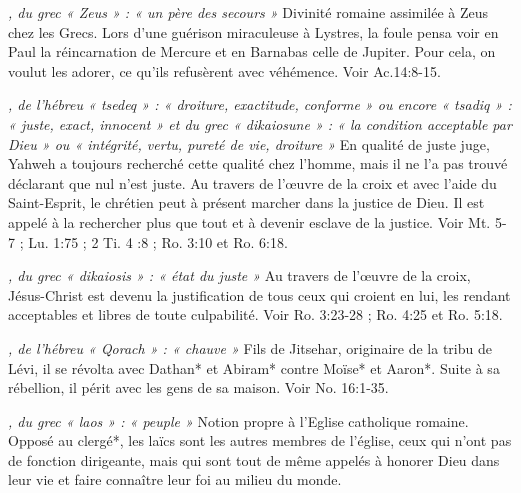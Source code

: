 \begin{multicols}{2}
{\textit{, du grec « Zeus » : « un père des secours »}\newline
Divinité romaine assimilée à Zeus chez les Grecs. Lors d'une guérison miraculeuse à Lystres, la foule pensa voir en Paul la réincarnation de Mercure et en Barnabas celle de Jupiter. Pour cela, on voulut les adorer, ce qu'ils refusèrent avec véhémence. Voir Ac.14:8-15.

\textit{, de l'hébreu « tsedeq » : « droiture, exactitude, conforme » ou encore « tsadiq » : « juste, exact, innocent » et du grec « dikaiosune » : « la condition acceptable par Dieu » ou « intégrité, vertu, pureté de vie, droiture »}\newline
En qualité de juste juge, Yahweh a toujours recherché cette qualité chez l'homme, mais il ne l'a pas trouvé déclarant que nul n'est juste. Au travers de l'œuvre de la croix et avec l'aide du Saint-Esprit, le chrétien peut à présent marcher dans la justice de Dieu. Il est appelé à la rechercher plus que tout et à devenir esclave de la justice. Voir Mt. 5-7 ; Lu. 1:75 ; 2 Ti. 4 :8 ; Ro. 3:10 et Ro. 6:18.

\textit{, du grec « dikaiosis » : « état du juste »}\newline
Au travers de l'œuvre de la croix, Jésus-Christ est devenu la justification de tous ceux qui croient en lui, les rendant acceptables et libres de toute culpabilité. Voir Ro. 3:23-28 ; Ro. 4:25 et Ro. 5:18.

\textit{, de l'hébreu « Qorach » : « chauve »}\newline
Fils de Jitsehar, originaire de la tribu de Lévi, il se révolta avec Dathan* et Abiram* contre Moïse* et Aaron*. Suite à sa rébellion, il périt avec les gens de sa maison. Voir No. 16:1-35.

\textit{, du grec « laos » : « peuple »}\newline
Notion propre à l'Eglise catholique romaine. Opposé au clergé*, les laïcs sont les autres membres de l'église, ceux qui n'ont pas de fonction dirigeante, mais qui sont tout de même appelés à honorer Dieu dans leur vie et faire connaître leur foi au milieu du monde.

}
\end{multicols}
